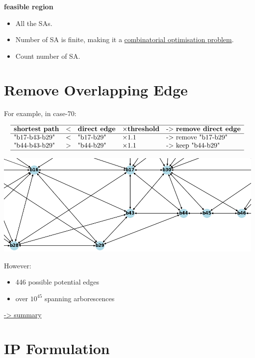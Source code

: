 \documentclass[
]{book}
\providecommand{\tightlist}{%
  \setlength{\itemsep}{0pt}\setlength{\parskip}{0pt}}
\begin{document}
\textbf{feasible region}

\begin{itemize}
\tightlist
\item
  All the SAs.
\item
  Number of SA is finite, making it a \protect\hyperlink{combinatorial}{combinatorial
  optimisation problem}.
\item
  Count number of SA.
\end{itemize}

\hypertarget{overlapping}{%
\section{Remove Overlapping Edge}\label{overlapping}}

For example, in case-70:

\[
\begin{array}{lllll}
  \hline
  \textbf{shortest path} & <
  & \textbf{direct edge} & \times \textbf{threshold}
  & \text{-> } \textbf{remove direct edge} \\
  \hline
  \text{"b17‐b43-b29"} & < & \text{"b17-b29"} & \times 1.1
  & \text{-> remove "b17-b29"} \\
  \text{"b44‐b43-b29"} & > & \text{"b44-b29"} & \times 1.1
  & \text{-> keep "b44-b29"} \\
  \hline
\end{array}
\]

\begin{center}\includegraphics[width=0.7\linewidth]{Pictures/overlapGeth} \end{center}

However:

\begin{itemize}
\tightlist
\item
  446 possible potential edges
\item
  over \(10^{45}\) spanning arborescences
\end{itemize}

\protect\hyperlink{summary}{-\textgreater{} summary}

\hypertarget{ip-formulation}{%
\section{IP Formulation}\label{ip-formulation}}
\end{document}

